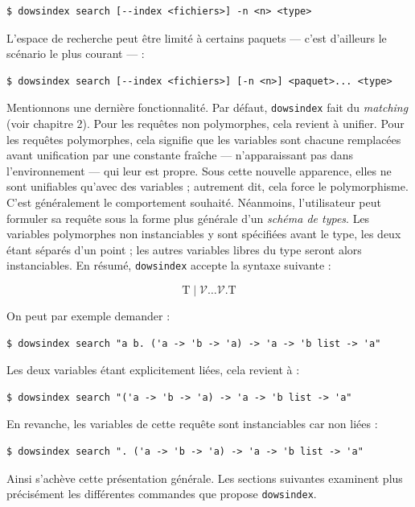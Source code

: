 \documentclass[a4paper]{report}
\theoremstyle{definition}
\newcommand{\dowsindex}{\texttt{dowsindex}\xspace}
\newcommand{\V}{\mathscr{V}}
\newcommand{\T}{\mathrm{T}}
\begin{document}
\begin{verbatim}
$ dowsindex search [--index <fichiers>] -n <n> <type>
\end{verbatim}

L'espace de recherche peut être limité à certains paquets — c'est d'ailleurs le scénario le plus courant — :

\begin{verbatim}
$ dowsindex search [--index <fichiers>] [-n <n>] <paquet>... <type>
\end{verbatim}

Mentionnons une dernière fonctionnalité. Par défaut, \dowsindex fait du \emph{matching} (voir chapitre 2). Pour les requêtes non polymorphes, cela revient à unifier. Pour les requêtes polymorphes, cela signifie que les variables sont chacune remplacées avant unification par une constante fraîche — n'apparaissant pas dans l'environnement — qui leur est propre. Sous cette nouvelle apparence, elles ne sont unifiables qu'avec des variables ; autrement dit, cela force le polymorphisme. C'est généralement le comportement souhaité. Néanmoins, l'utilisateur peut formuler sa requête sous la forme plus générale d'un \emph{schéma de types}. Les variables polymorphes non instanciables y sont spécifiées avant le type, les deux étant séparés d'un point ; les autres variables libres du type seront alors instanciables. En résumé, \dowsindex accepte la syntaxe suivante :

\[ \T \mid \V \dots \V \texttt{.} \T \]

On peut par exemple demander :

\begin{verbatim}
$ dowsindex search "a b. ('a -> 'b -> 'a) -> 'a -> 'b list -> 'a"
\end{verbatim}

Les deux variables étant explicitement liées, cela revient à :

\begin{verbatim}
$ dowsindex search "('a -> 'b -> 'a) -> 'a -> 'b list -> 'a"
\end{verbatim}

En revanche, les variables de cette requête sont instanciables car non liées :

\begin{verbatim}
$ dowsindex search ". ('a -> 'b -> 'a) -> 'a -> 'b list -> 'a"
\end{verbatim}

Ainsi s'achève cette présentation générale. Les sections suivantes examinent plus précisément les différentes commandes que propose \dowsindex.
\end{document}
